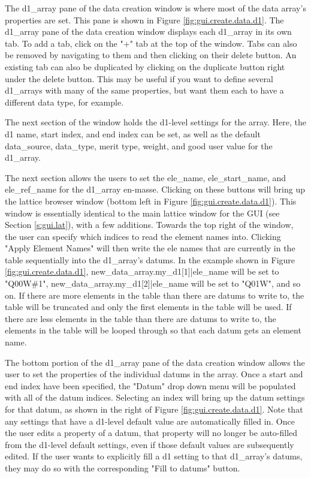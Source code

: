 The d1_array pane of the data creation window is where most of the data array's properties are set.
This pane is shown in Figure \ref{fig:gui.create.data.d1}.
The d1_array pane of the data creation window displays each d1_array in its own tab.
To add a tab, click on the "+" tab at the top of the window.
Tabs can also be removed by navigating to them and then clicking on their delete button.
An existing tab can also be duplicated by clicking on the duplicate button right under the delete button.
This may be useful if you want to define several d1_arrays with many of the same properties, but want them each to have a different data type, for example.

The next section of the window holds the d1-level settings for the array.
Here, the d1 name, start index, and end index can be set, as well as the default data_source, data_type, merit type, weight, and good user value for the d1_array.

The next section allows the users to set the ele_name, ele_start_name, and ele_ref_name for the d1_array en-masse.
Clicking on these buttons will bring up the lattice browser window (bottom left in Figure \ref{fig:gui.create.data.d1}).
This window is essentially identical to the main lattice window for the GUI (see Section \ref{s:gui.lat}), with a few additions.
Towards the top right of the window, the user can specify which indices to read the element names into.
Clicking "Apply Element Names" will then write the ele names that are currently in the table sequentially into the d1_array's datums.
In the example shown in Figure \ref{fig:gui.create.data.d1}, new_data_array.my_d1[1]|ele_name will be set to "Q00W\#1", new_data_array.my_d1[2]|ele_name will be set to "Q01W", and so on.
If there are more elements in the table than there are datums to write to, the table will be truncated and only the first elements in the table will be used.
If there are less elements in the table than there are datums to write to, the elements in the table will be looped through so that each datum gets an element name.

The bottom portion of the d1_array pane of the data creation window allows the user to set the properties of the individual datums in the array.
Once a start and end index have been specified, the "Datum" drop down menu will be populated with all of the datum indices.
Selecting an index will bring up the datum settings for that datum, as shown in the right of Figure \ref{fig:gui.create.data.d1}.
Note that any settings that have a d1-level default value are automatically filled in.
Once the user edits a property of a datum, that property will no longer be auto-filled from the d1-level default settings, even if those default values are subsequently edited.
If the user wants to explicitly fill a d1 setting to that d1_array's datums, they may do so with the corresponding "Fill to datums" button.

